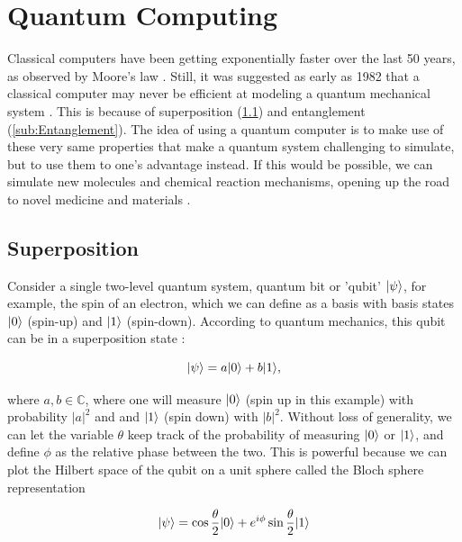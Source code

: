 \section{Quantum Computing}

Classical computers have been getting exponentially faster over the last 50 years, as observed by Moore's law \cite{Moore1965}. 
Still, it was suggested as early as 1982 that a classical computer may never be efficient at modeling a quantum mechanical system \cite{Feynman1982}. 
This is because of superposition (\cref{sub:Superposition}) and entanglement (\cref{sub:Entanglement}). 
The idea of using a quantum computer is to make use of these very same properties that make a quantum system challenging to simulate, but to use them to one's advantage instead. 
If this would be possible, we can simulate new molecules and chemical reaction mechanisms, opening up the road to novel medicine \cite{Robert2021} and materials \cite{Ma2020}. 

\subsection{Superposition}\label{sub:Superposition}

Consider a single two-level quantum system, quantum bit or 'qubit' $\lvert\psi\rangle$, for example, the spin of an electron, which we can define as a basis with basis states $\lvert0\rangle$ (spin-up) and $\lvert1\rangle$ (spin-down). 
According to quantum mechanics, this qubit can be in a superposition state \cite{Griffiths2004}:

\begin{equation}\label{eq:SuperPositionBasic}
	\lvert\psi\rangle=a\lvert0\rangle+b\lvert1\rangle,
\end{equation}

where $a,b \in \mathbb{C}$, where one will measure $\lvert0\rangle$ (spin up in this example) with probability $|a|^2$ and and $\lvert1\rangle$ (spin down) with $|b|^2$. 
Without loss of generality, we can let the variable $\theta$ keep track of the probability of measuring $\lvert0\rangle$ or $\lvert1\rangle$, and define $\phi$ as the relative phase between the two. 
This is powerful because we can plot the Hilbert space of the qubit on a unit sphere called the Bloch sphere representation \cite{Nielsen2011}

\begin{equation}\label{eq:BlochSphere}
	\lvert\psi\rangle = 
	\cos{\frac{\theta}{2}} \lvert0\rangle + e^{i \phi} \sin{\frac{\theta}{2}} \lvert1\rangle
\end{equation}


